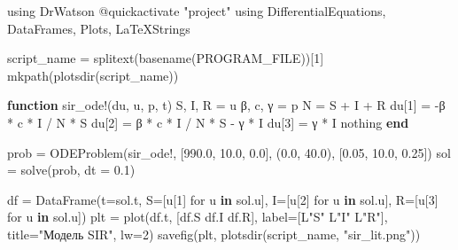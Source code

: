 \documentclass[
  english,
  russian,
  12pt,
  a4paper,
  DIV=11,
  numbers=noendperiod]{scrartcl}
\newenvironment{Shaded}{\begin{snugshade}}{\end{snugshade}}
\newcommand{\BuiltInTok}[1]{\textcolor[rgb]{0.00,0.23,0.31}{#1}}
\newcommand{\ConstantTok}[1]{\textcolor[rgb]{0.56,0.35,0.01}{#1}}
\newcommand{\FloatTok}[1]{\textcolor[rgb]{0.68,0.00,0.00}{#1}}
\newcommand{\FunctionTok}[1]{\textcolor[rgb]{0.28,0.35,0.67}{#1}}
\newcommand{\ImportTok}[1]{\textcolor[rgb]{0.00,0.46,0.62}{#1}}
\newcommand{\KeywordTok}[1]{\textcolor[rgb]{0.00,0.23,0.31}{\textbf{#1}}}
\newcommand{\NormalTok}[1]{\textcolor[rgb]{0.00,0.23,0.31}{#1}}
\newcommand{\OperatorTok}[1]{\textcolor[rgb]{0.37,0.37,0.37}{#1}}
\newcommand{\PreprocessorTok}[1]{\textcolor[rgb]{0.68,0.00,0.00}{#1}}
\newcommand{\StringTok}[1]{\textcolor[rgb]{0.13,0.47,0.30}{#1}}
\begin{document}
\begin{Shaded}
\begin{Highlighting}[]
\ImportTok{using} \BuiltInTok{DrWatson}
\PreprocessorTok{@quickactivate} \StringTok{"project"}
\ImportTok{using} \BuiltInTok{DifferentialEquations}\NormalTok{, }\BuiltInTok{DataFrames}\NormalTok{, }\BuiltInTok{Plots}\NormalTok{, }\BuiltInTok{LaTeXStrings}

\NormalTok{script\_name }\OperatorTok{=} \FunctionTok{splitext}\NormalTok{(}\FunctionTok{basename}\NormalTok{(}\ConstantTok{PROGRAM\_FILE}\NormalTok{))[}\FloatTok{1}\NormalTok{]}
\FunctionTok{mkpath}\NormalTok{(}\FunctionTok{plotsdir}\NormalTok{(script\_name))}

\KeywordTok{function} \FunctionTok{sir\_ode!}\NormalTok{(du, u, p, t)}
\NormalTok{    S, I, R }\OperatorTok{=}\NormalTok{ u}
\NormalTok{    β, c, γ }\OperatorTok{=}\NormalTok{ p}
\NormalTok{    N }\OperatorTok{=}\NormalTok{ S }\OperatorTok{+}\NormalTok{ I }\OperatorTok{+}\NormalTok{ R}
\NormalTok{    du[}\FloatTok{1}\NormalTok{] }\OperatorTok{=} \OperatorTok{{-}}\NormalTok{β }\OperatorTok{*}\NormalTok{ c }\OperatorTok{*}\NormalTok{ I }\OperatorTok{/}\NormalTok{ N }\OperatorTok{*}\NormalTok{ S}
\NormalTok{    du[}\FloatTok{2}\NormalTok{] }\OperatorTok{=}\NormalTok{ β }\OperatorTok{*}\NormalTok{ c }\OperatorTok{*}\NormalTok{ I }\OperatorTok{/}\NormalTok{ N }\OperatorTok{*}\NormalTok{ S }\OperatorTok{{-}}\NormalTok{ γ }\OperatorTok{*}\NormalTok{ I}
\NormalTok{    du[}\FloatTok{3}\NormalTok{] }\OperatorTok{=}\NormalTok{ γ }\OperatorTok{*}\NormalTok{ I}
    \ConstantTok{nothing}
\KeywordTok{end}

\NormalTok{prob }\OperatorTok{=} \FunctionTok{ODEProblem}\NormalTok{(sir\_ode!, [}\FloatTok{990.0}\NormalTok{, }\FloatTok{10.0}\NormalTok{, }\FloatTok{0.0}\NormalTok{], (}\FloatTok{0.0}\NormalTok{, }\FloatTok{40.0}\NormalTok{), [}\FloatTok{0.05}\NormalTok{, }\FloatTok{10.0}\NormalTok{, }\FloatTok{0.25}\NormalTok{])}
\NormalTok{sol }\OperatorTok{=} \FunctionTok{solve}\NormalTok{(prob, dt }\OperatorTok{=} \FloatTok{0.1}\NormalTok{)}

\NormalTok{df }\OperatorTok{=} \FunctionTok{DataFrame}\NormalTok{(t}\OperatorTok{=}\NormalTok{sol.t, S}\OperatorTok{=}\NormalTok{[u[}\FloatTok{1}\NormalTok{] for u }\KeywordTok{in}\NormalTok{ sol.u], I}\OperatorTok{=}\NormalTok{[u[}\FloatTok{2}\NormalTok{] for u }\KeywordTok{in}\NormalTok{ sol.u], R}\OperatorTok{=}\NormalTok{[u[}\FloatTok{3}\NormalTok{] for u }\KeywordTok{in}\NormalTok{ sol.u])}
\NormalTok{plt }\OperatorTok{=} \FunctionTok{plot}\NormalTok{(df.t, [df.S df.I df.R], label}\OperatorTok{=}\NormalTok{[L}\StringTok{"S"}\NormalTok{ L}\StringTok{"I"}\NormalTok{ L}\StringTok{"R"}\NormalTok{], title}\OperatorTok{=}\StringTok{"Модель SIR"}\NormalTok{, lw}\OperatorTok{=}\FloatTok{2}\NormalTok{)}
\FunctionTok{savefig}\NormalTok{(plt, }\FunctionTok{plotsdir}\NormalTok{(script\_name, }\StringTok{"sir\_lit.png"}\NormalTok{))}
\end{Highlighting}
\end{Shaded}
\end{document}
